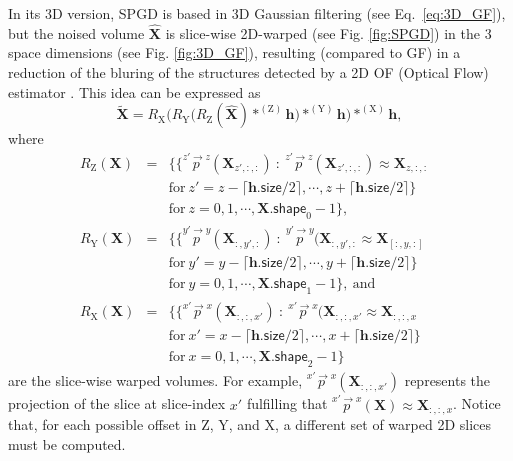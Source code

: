 In its 3D version, SPGD is based in 3D Gaussian filtering (see
Eq.~\ref{eq:3D_GF}), but the noised volume $\hat{\mathbf{X}}$ is
slice-wise 2D-warped (see Fig. \ref{fig:SPGD}) in the 3 space
dimensions (see Fig. \ref{fig:3D_GF}), resulting (compared to GF) in a
reduction of the bluring of the structures detected by a 2D OF
(Optical Flow) estimator \cite{gonzalez2023structure}. This idea can
be expressed as
\begin{equation}
  \tilde{\mathbf{X}}  = R_\text{X}\Big(R_\text{Y}\big(R_\text{Z}(\hat{\mathbf{X}})*^{(\text{Z})}{\mathbf h}\big)*^{(\text{Y})}{\mathbf h}\Big)*^{(\text{X})}{\mathbf h},
    \label{eq:SDPG}
\end{equation}
where
\begin{equation*}
  \begin{array}{rclll}
    R_\text{Z}(\mathbf{X}) & = & \big\{ \{ \overset{z'\rightarrow z}p(\mathbf{X}_{z',:,:})~:~\overset{z'\rightarrow z}p(\mathbf{X}_{z',:,:})\approx\mathbf{X}_{z,:,:} & \\ & & \text{for}~z'=z-\lceil\mathbf{h}.\mathsf{size}/2\rceil,\cdots,z+\lceil\mathbf{h}.\mathsf{size}/2\rceil\} & \\ & & \text{for}~z=0,1,\cdots,\mathbf{X}.\mathsf{shape}_0-1\big\}, \\
    R_\text{Y}(\mathbf{X}) & = & \big\{ \{ \overset{y'\rightarrow y}p(\mathbf{X}_{:,y',:})~:~\overset{y'\rightarrow y}p(\mathbf{X}_{:,y',:}\approx\mathbf{X}_{[:,y,:]} & \\ & & \text{for}~y'=y-\lceil\mathbf{h}.\mathsf{size}/2\rceil,\cdots,y+\lceil\mathbf{h}.\mathsf{size}/2\rceil\} & \\ & & \text{for}~y=0,1,\cdots,\mathbf{X}.\mathsf{shape}_1-1\big\},~\text{and} \\
    R_\text{X}(\mathbf{X}) & = & \big\{ \{ \overset{x'\rightarrow x}p(\mathbf{X}_{:,:,x'})~:~\overset{x'\rightarrow x}p(\mathbf{X}_{:,:,x'}\approx\mathbf{X}_{:,:,x} & \\ & & \text{for}~x'=x-\lceil\mathbf{h}.\mathsf{size}/2\rceil,\cdots,x+\lceil\mathbf{h}.\mathsf{size}/2\rceil\} & \\ & & \text{for}~x=0,1,\cdots,\mathbf{X}.\mathsf{shape}_2-1\big\}
    \end{array}
\end{equation*}
are the slice-wise warped volumes. For example,
$\overset{x'\rightarrow x}p(\mathbf{X}_{:,:,x'})$ represents the
projection of the slice at slice-index $x'$ fulfilling that
$\overset{x'\rightarrow
  x}p({\mathbf{X}})\approx{\mathbf{X}}_{:,:,x}$. Notice that, for
each possible offset in $\text{Z}$, $\text{Y}$, and $\text{X}$, a
different set of warped 2D slices must be computed.

